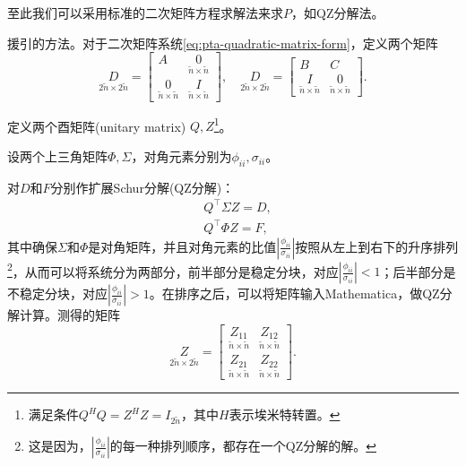 至此我们可以采用标准的二次矩阵方程求解法来求$P$，如QZ分解法。
\begin{remark}[QZ分解法求解二次矩阵方程系统]
  \label{remark:pta-QZ-decomp}
  援引\cite[pp.43-45]{Uhlig:1999vx}的方法。对于二次矩阵系统\eqref{eq:pta-quadratic-matrix-form}，定义两个矩阵
  \begin{equation*}
    \underset{2 \tilde{n} \times 2 \tilde{n}}{D} =
    \begin{bmatrix}
      A & \underset{\tilde{n} \times \tilde{n}}{0} \\
      \underset{\tilde{n} \times \tilde{n}}{0} & \underset{\tilde{n} \times \tilde{n}}{I}
    \end{bmatrix}, \quad
    \underset{2 \tilde{n} \times 2 \tilde{n}}{D} =
    \begin{bmatrix}
      B & C \\
      \underset{\tilde{n} \times \tilde{n}}{I} & \underset{\tilde{n} \times \tilde{n}}{0}
    \end{bmatrix}.
  \end{equation*}

  定义两个酉矩阵(unitary matrix) $Q,Z$\footnote{满足条件$Q^{H}Q=Z^{H}Z=I_{2\tilde{n}}$，其中$H$表示埃米特转置。}。

  设两个上三角矩阵$\Phi, \Sigma$，对角元素分别为$\phi_{ii}, \sigma_{ii}$。

  对$D$和$F$分别作扩展Schur分解(QZ分解)：
  \begin{equation*}
    \begin{split}
      &Q^{\top} \Sigma Z = D, \\
      &Q^{\top} \Phi Z = F,
    \end{split}
  \end{equation*}
  其中确保$\Sigma$和$\Phi$是对角矩阵，并且对角元素的比值$\left| \frac{\phi_{ii}}{\sigma_{ii}} \right|$按照从左上到右下的升序排列\footnote{这是因为，$\left| \frac{\phi_{ii}}{\sigma_{ii}} \right|$的每一种排列顺序，都存在一个QZ分解的解。}，从而可以将系统分为两部分，前半部分是稳定分块，对应$\left| \frac{\phi_{ii}}{\sigma_{ii}} \right| <1$；后半部分是不稳定分块，对应$\left| \frac{\phi_{ii}}{\sigma_{ii}} \right| >1$。在排序之后，可以将矩阵输入Mathematica，做QZ分解计算。测得的矩阵
  \begin{equation*}
    \underset{2 \tilde{n} \times 2 \tilde{n}}{Z} = \begin{bmatrix}
    \underset{\tilde{n} \times \tilde{n}}{Z_{11}} &
    \underset{\tilde{n} \times \tilde{n}}{Z_{12}} \\
    \underset{\tilde{n} \times \tilde{n}}{Z_{21}} &
    \underset{\tilde{n} \times \tilde{n}}{Z_{22}}
    \end{bmatrix}.
  \end{equation*}


\end{remark}
